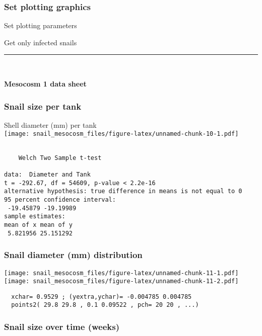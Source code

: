 \documentclass[10,portrait]{article}
\begin{document}
\subsubsection{Set plotting graphics}\label{set-plotting-graphics}

Set plotting parameters

Get only infected snails

\begin{center}\rule{0.5\linewidth}{\linethickness}\end{center}

~

\textbf{Mesocosm 1 data sheet}

\subsubsection{Snail size per tank}\label{snail-size-per-tank}

Shell diameter (mm) per tank\\
\texttt{[image: snail\_mesocosm\_files/figure-latex/unnamed-chunk-10-1.pdf]}

\begin{verbatim}

    Welch Two Sample t-test

data:  Diameter and Tank
t = -292.67, df = 54609, p-value < 2.2e-16
alternative hypothesis: true difference in means is not equal to 0
95 percent confidence interval:
 -19.45879 -19.19989
sample estimates:
mean of x mean of y 
 5.821956 25.151292 
\end{verbatim}

\subsubsection{Snail diameter (mm)
distribution}\label{snail-diameter-mm-distribution}

\texttt{[image: snail\_mesocosm\_files/figure-latex/unnamed-chunk-11-1.pdf]}
\texttt{[image: snail\_mesocosm\_files/figure-latex/unnamed-chunk-11-2.pdf]}

\begin{verbatim}
  xchar= 0.9529 ; (yextra,ychar)= -0.004785 0.004785 
  points2( 29.8 29.8 , 0.1 0.09522 , pch= 20 20 , ...) 
\end{verbatim}

\subsubsection{Snail size over time
(weeks)}\label{snail-size-over-time-weeks}
\end{document}
